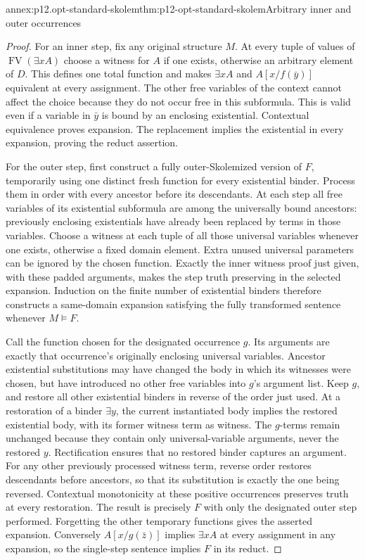 \begin{annexitem}{annex:p12.opt-standard-skolem}{thm:p12-opt-standard-skolem}{Arbitrary inner and outer occurrences}
\begin{proof}
For an inner step, fix any original structure \(M\).
At every tuple of values of \(\operatorname{FV}(\exists xA)\)
choose a witness for \(A\) if one exists, otherwise an arbitrary
element of \(D\). This defines one total function and makes
\(\exists xA\) and \(A[x/f(\bar y)]\) equivalent at every
assignment. The other free variables of the context cannot affect
the choice because they do not occur free in this subformula.
This is valid even if a variable in \(\bar y\) is bound by an
enclosing existential. Contextual equivalence proves expansion.
The replacement implies the existential in every expansion,
proving the reduct assertion.

For the outer step, first construct a fully outer-Skolemized
version of \(F\), temporarily using one distinct fresh function
for every existential binder. Process them in order with every
ancestor before its descendants. At each step all free variables
of its existential subformula are among the universally bound
ancestors: previously enclosing existentials have already been
replaced by terms in those variables. Choose a witness at each
tuple of all those universal variables whenever one exists,
otherwise a fixed domain element. Extra unused universal
parameters can be ignored by the chosen function.
Exactly the inner witness proof just given, with these padded
arguments, makes the step truth preserving in the selected
expansion. Induction on the finite number of existential binders
therefore constructs a same-domain expansion satisfying the
fully transformed sentence whenever \(M\models F\).

Call the function chosen for the designated occurrence \(g\).
Its arguments are exactly that occurrence's originally enclosing
universal variables. Ancestor existential substitutions may have
changed the body in which its witnesses were chosen, but have
introduced no other free variables into \(g\)'s argument list.
Keep \(g\), and restore all other existential binders in reverse
of the order just used. At a restoration of a binder \(\exists y\),
the current instantiated body implies the restored existential
body, with its former witness term as witness. The \(g\)-terms
remain unchanged because they contain only universal-variable
arguments, never the restored \(y\).
Rectification ensures that no restored binder captures an
argument. For any other previously processed witness term,
reverse order restores descendants before ancestors, so that
its substitution is exactly the one being reversed.
Contextual monotonicity at these positive occurrences preserves
truth at every restoration. The result is precisely \(F\) with
only the designated outer step performed.
Forgetting the other temporary functions gives the asserted
expansion. Conversely \(A[x/g(\bar z)]\) implies \(\exists xA\)
at every assignment in any expansion, so the single-step
sentence implies \(F\) in its reduct.


\end{proof}
\end{annexitem}
